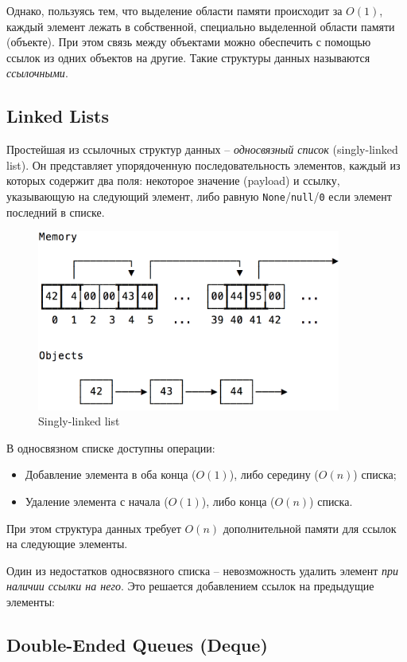 \documentclass[12pt,a4paper]{report}
\begin{document}
Однако, пользуясь тем, что выделение области памяти происходит за $O(1)$, каждый элемент лежать в собственной, специально выделенной области памяти (объекте). При этом связь между объектами можно обеспечить с помощью ссылок из одних объектов на другие. Такие структуры данных называются {\em ссылочными}.

\subsection*{Linked Lists}

Простейшая из ссылочных структур данных -- {\em односвязный список} (singly-linked list). Он представляет упорядоченную последовательность элементов, каждый из которых содержит два поля: некоторое значение (payload) и ссылку, указывающую на следующий элемент, либо равную {\tt None}/{\tt null}/{\tt 0} если элемент последний в списке.

\begin{figure}[!ht]
\centering
\includegraphics[width=10cm]{linkedlist.png}
\caption{Singly-linked list}
\end{figure}

В односвязном списке доступны операции:
\begin{itemize}
  \item Добавление элемента в оба конца ($O(1)$), либо середину ($O(n)$) списка;
  \item Удаление элемента с начала ($O(1)$), либо конца ($O(n)$) списка.
\end{itemize}

При этом структура данных требует $O(n)$ дополнительной памяти для ссылок на следующие элементы.

Один из недостатков односвязного списка -- невозможность удалить элемент {\em при наличии ссылки на него}. Это решается добавлением ссылок на предыдущие элементы:

\subsection*{Double-Ended Queues (Deque)}
\end{document}
